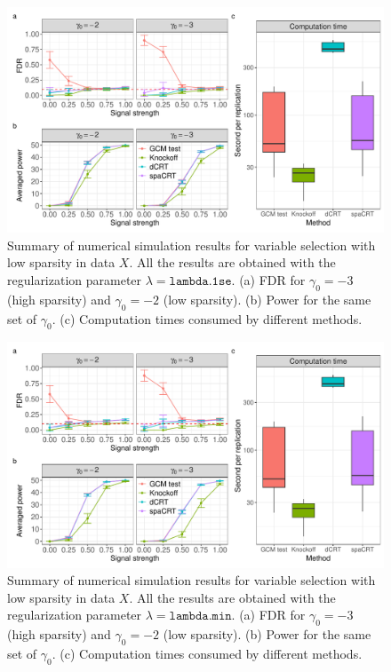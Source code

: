 \documentclass[12pt]{article}
\theoremstyle{definition}
\begin{document}
\begin{figure}[!ht]
  \centering
  \includegraphics[width=1.0\textwidth]{figures-and-tables/simulation/HMM-variable-selection/HMM_simulation_uniform_lambda.1se.pdf}
  \caption{Summary of numerical simulation results for variable selection  with low sparsity in data $X$. All the results are obtained with the regularization parameter $\lambda=\texttt{lambda.1se}$. (a) FDR for $\gamma_0=-3$ (high sparsity) and $\gamma_0=-2$ (low sparsity). (b) Power for the same set of $\gamma_0$. (c) Computation times consumed by different methods. }
  \label{fig:simulation-summary-GWAS-uniform-lambda-1se}
\end{figure}

\begin{figure}[!ht]
  \centering
  \includegraphics[width=1.0\textwidth]{figures-and-tables/simulation/HMM-variable-selection/HMM_simulation_uniform_lambda.min.pdf}
  \caption{Summary of numerical simulation results for variable selection  with low sparsity in data $X$. All the results are obtained with the regularization parameter $\lambda=\texttt{lambda.min}$. (a) FDR for $\gamma_0=-3$ (high sparsity) and $\gamma_0=-2$ (low sparsity). (b) Power for the same set of $\gamma_0$. (c) Computation times consumed by different methods. }
  \label{fig:simulation-summary-GWAS-uniform-lambda-min}
\end{figure}
\end{document}
